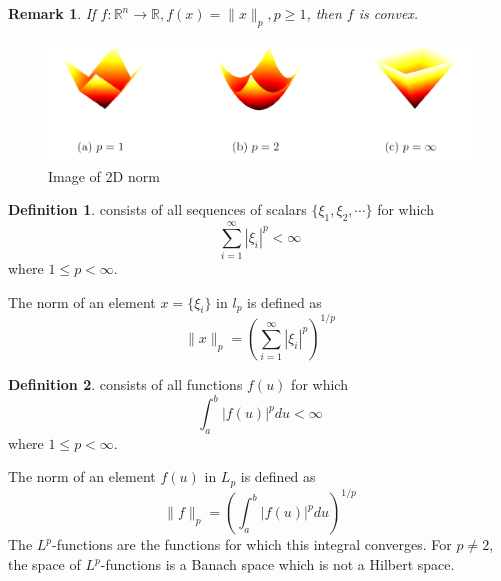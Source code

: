 \documentclass[a4paper]{article}
\theoremstyle{definition}
\newtheorem{definition}{Definition}
\theoremstyle{plain}
\newtheorem{remark}{Remark}
\begin{document}
\begin{remark}
If $f:\mathbb{R}^n\rightarrow\mathbb{R}, f(x)=\|x\|_p, p\ge1$, then $f$ is convex.
\end{remark}

\begin{figure}[H]\label{convex}
\centering
\includegraphics[scale=0.25]{figure/convex.png}
\caption{Image of 2D norm}
\end{figure}

\begin{definition}
 consists of all sequences of scalars $\{\xi_1,\xi_2,\cdots\}$ for which
\begin{equation*}
    \sum^\infty_{i=1}|\xi_i|^p<\infty
\end{equation*}
where $1\le p<\infty$.
\end{definition}
The norm of an element $x=\{\xi_i\}$ in $l_p$ is defined as 
\begin{equation*}
    \|x\|_p=\left(\sum^\infty_{i=1}|\xi_i|^p\right)^{1/p}
\end{equation*}

\begin{definition}
 consists of all functions $f(u)$ for which
\begin{equation*}
    \int^b_a|f(u)|^pdu<\infty
\end{equation*}
where $1\le p<\infty$.
\end{definition}
The norm of an element $f(u)$ in $L_p$ is defined as 
\begin{equation*}
    \|f\|_p=\left(\int^b_a|f(u)|^pdu\right)^{1/p}
\end{equation*}
The $L^p$-functions are the functions for which this integral converges. For $p\not=2$, the space of $L^p$-functions is a Banach space which is not a Hilbert space.
\end{document}
